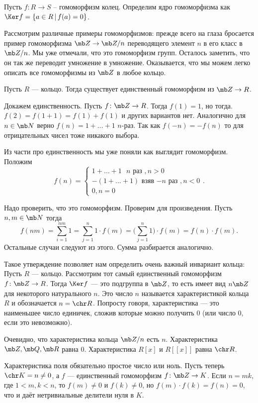\dfn Пусть $f\colon R \to S $  -- гомоморфизм колец. Определим ядро гомоморфизма  как $\Ker f=\{ a \in R\,|\, f(a)=0\}$.
\edfn


Рассмотрим различные примеры гомоморфизмов: прежде всего на  глаза бросается пример гомоморфизма $\mb Z\to \mb Z/n$ переводящего элемент $n$ в его класс в $\mb Z/n$. Мы уже отмечали, что это гомоморфизм групп. Осталось заметить, что он так же переводит умножение в умножение. Оказывается, что мы можем легко описать все гомоморфизмы из $\mb Z$ в любое кольцо.


\thrm Пусть $R$ --- кольцо. Тогда существует единственный гомоморфизм из $\mb Z \to R$.
\ethrm

\proof Докажем единственность. Пусть $f\colon \mb Z \to  R$. Тогда $f(1)=1$, но тогда. $f(2)=f(1+1)=f(1)+f(1)$ и других вариантов нет. Аналогично для $n\in \mb N$ верно $f(n)=1+\dots+1$ $n$-раз. Так как $f(-n)=-f(n)$ то для отрицательных чисел тоже никакого выбора.

Из части про единственность мы уже поняли как выглядит гомоморфизм. Положим $$f(n)=\begin{cases}
1+\dots+1 \text{ $n$ раз }, n>0\\
-(1+\dots+1) \text{ взяв $-n$ раз }, n<0\\
0, n=0
\end{cases}.$$

Надо проверить, что это гомоморфизм. Проверим для произведения. Пусть $n,m\in \mb N$ тогда 
$$f(nm)=\sum_{i=1}^{nm} 1= \sum_{j=1}^n 1\cdot f(m)=\Big(\sum_{j=1}^n 1\Big)\cdot f(m)=f(n)\cdot f(m).$$
Остальные случаи следуют из этого. Сумма разбирается аналогично.
\endproof





Такое утверждение позволяет нам определить очень важный инвариант кольца:
\dfn Пусть $R$ --- кольцо. Рассмотрим тот самый единственный гомоморфизм $f\colon \mb Z \to R$. Тогда $\Ker f$
--- это подгруппа в $\mb Z$, то есть имеет вид $n\mb Z$ для некоторого натурального $n$. Это число $n$ называется характеристикой кольца $R$ и обозначается $n=\chr R$. Попросту говоря, характеристика --- это наименьшее число единичек, сложив которые можно получить $0$ (или число $0$, если это невозможно).
\edfn

Очевидно, что характеристика кольца $\mb Z/n$ есть $n$. Характеристика $\mb Z, \mb Q,\mb  R$  равна $0$. Характеристика $R[x]$ и $R[[x]]$ равна $\chr R$.

\rm Характеристика поля обязательно простое число или ноль.
\proof  Пусть теперь $\chr K=n\neq 0$, а $f$ --- единственный гомоморфизм $f\colon \mb Z \to K$. Если $n=mk$, где $1<m,k< n$, то $f(m)\neq 0$ и $f(k)\neq 0$, но $f(m)\cdot f(k)=f(n)=0$, что и даёт нетривиальные делители нуля в $K$.
\endproof
\erm



